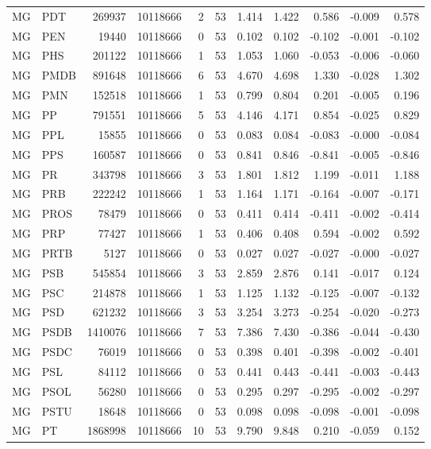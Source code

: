 \begin{landscape}
\begin{longtable}{llrrrrrrrrr}
MG & PDT & 269937 & 10118666 & 2 & 53 & 1.414 & 1.422 & 0.586 & -0.009 & 0.578 \\
MG & PEN & 19440 & 10118666 & 0 & 53 & 0.102 & 0.102 & -0.102 & -0.001 & -0.102 \\
MG & PHS & 201122 & 10118666 & 1 & 53 & 1.053 & 1.060 & -0.053 & -0.006 & -0.060 \\
MG & PMDB & 891648 & 10118666 & 6 & 53 & 4.670 & 4.698 & 1.330 & -0.028 & 1.302 \\
MG & PMN & 152518 & 10118666 & 1 & 53 & 0.799 & 0.804 & 0.201 & -0.005 & 0.196 \\
MG & PP & 791551 & 10118666 & 5 & 53 & 4.146 & 4.171 & 0.854 & -0.025 & 0.829 \\
MG & PPL & 15855 & 10118666 & 0 & 53 & 0.083 & 0.084 & -0.083 & -0.000 & -0.084 \\
MG & PPS & 160587 & 10118666 & 0 & 53 & 0.841 & 0.846 & -0.841 & -0.005 & -0.846 \\
MG & PR & 343798 & 10118666 & 3 & 53 & 1.801 & 1.812 & 1.199 & -0.011 & 1.188 \\
MG & PRB & 222242 & 10118666 & 1 & 53 & 1.164 & 1.171 & -0.164 & -0.007 & -0.171 \\
MG & PROS & 78479 & 10118666 & 0 & 53 & 0.411 & 0.414 & -0.411 & -0.002 & -0.414 \\
MG & PRP & 77427 & 10118666 & 1 & 53 & 0.406 & 0.408 & 0.594 & -0.002 & 0.592 \\
MG & PRTB & 5127 & 10118666 & 0 & 53 & 0.027 & 0.027 & -0.027 & -0.000 & -0.027 \\
MG & PSB & 545854 & 10118666 & 3 & 53 & 2.859 & 2.876 & 0.141 & -0.017 & 0.124 \\
MG & PSC & 214878 & 10118666 & 1 & 53 & 1.125 & 1.132 & -0.125 & -0.007 & -0.132 \\
MG & PSD & 621232 & 10118666 & 3 & 53 & 3.254 & 3.273 & -0.254 & -0.020 & -0.273 \\
MG & PSDB & 1410076 & 10118666 & 7 & 53 & 7.386 & 7.430 & -0.386 & -0.044 & -0.430 \\
MG & PSDC & 76019 & 10118666 & 0 & 53 & 0.398 & 0.401 & -0.398 & -0.002 & -0.401 \\
MG & PSL & 84112 & 10118666 & 0 & 53 & 0.441 & 0.443 & -0.441 & -0.003 & -0.443 \\
MG & PSOL & 56280 & 10118666 & 0 & 53 & 0.295 & 0.297 & -0.295 & -0.002 & -0.297 \\
MG & PSTU & 18648 & 10118666 & 0 & 53 & 0.098 & 0.098 & -0.098 & -0.001 & -0.098 \\
MG & PT & 1868998 & 10118666 & 10 & 53 & 9.790 & 9.848 & 0.210 & -0.059 & 0.152 \\

\end{longtable}
\end{landscape}
